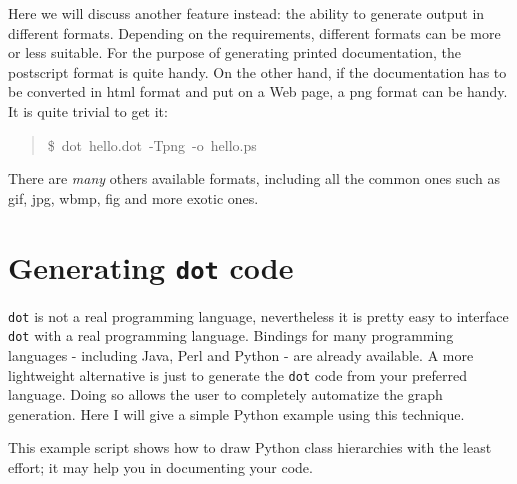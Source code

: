 \documentclass[10pt,english]{article}
\begin{document}
Here we will discuss another feature instead: the ability to generate output 
in different formats.
Depending on the requirements, different formats can be more or
less suitable. For the purpose of generating printed documentation, 
the postscript format is quite handy. On the other hand, if the documentation
has to be converted in html format and put on a Web page, a png
format can be handy. It is quite trivial to get it:
\begin{quote}
\begin{ttfamily}\begin{flushleft}
\mbox{{\$}~dot~hello.dot~-Tpng~-o~hello.ps}
\end{flushleft}\end{ttfamily}
\end{quote}

There are \emph{many} others available formats, including all the common ones
such as gif, jpg, wbmp, fig and more exotic ones.



\hypertarget{generating-dot-code}{}
\section*{Generating \texttt{dot} code}

\texttt{dot} is not a real programming language, nevertheless it is pretty easy
to interface \texttt{dot} with a real programming language.  Bindings for 
many programming languages - including Java, Perl and Python - are already
available. A more lightweight alternative is just to generate the \texttt{dot} code
from your preferred language. 
Doing so allows the user to completely automatize the graph generation. 
Here I will give a simple Python example using this technique.

This example script shows how to draw Python class hierarchies 
with the least effort; it may help you in documenting your code.
\end{document}
